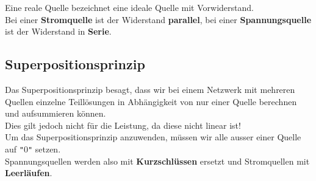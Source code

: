 										\beginip
										Eine reale Quelle bezeichnet eine ideale Quelle mit Vorwiderstand. \\
										Bei einer \textbf{Stromquelle} ist der Widerstand \textbf{parallel}, bei einer \textbf{Spannungsquelle} ist der Widerstand in \textbf{Serie}.
											\begin{center}
												\fix
											\end{center}
										\iend




																				\subsection{Superpositionsprinzip}

																				 Das Superpositionsprinzip besagt, dass wir bei einem Netzwerk mit mehreren Quellen einzelne Teillösungen in Abhängigkeit von nur einer Quelle berechnen und aufsummieren können. \\
																				 Dies gilt jedoch nicht für die Leistung, da diese nicht linear ist! \\
																				 Um das Superpositionsprinzip anzuwenden, müssen wir alle ausser einer Quelle auf \texttt{"}0\texttt{"} setzen. \\
																				 Spannungsquellen werden also mit \textbf{Kurzschlüssen} ersetzt und Stromquellen mit \textbf{Leerläufen}. \\
																				 \begin{center}
																				 	\fix
																				 \end{center}


